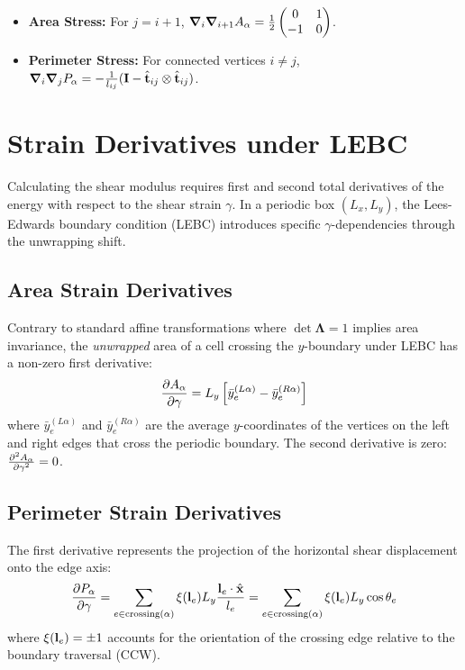\documentclass[12pt]{article}
\begin{document}
\begin{itemize}
    \item \textbf{Area Stress:} For $j = i+1$, $\grad_i \grad_{i+1} A_\alpha = \frac{1}{2} \begin{pmatrix} 0 & 1 \\ -1 & 0 \end{pmatrix}$.
    \item \textbf{Perimeter Stress:} For connected vertices $i \neq j$, $\grad_i \grad_j P_\alpha = -\frac{1}{l_{ij}} (\vb{I} - \hat{\vb{t}}_{ij} \otimes \hat{\vb{t}}_{ij})$.
\end{itemize}

\section{Strain Derivatives under LEBC}

Calculating the shear modulus requires first and second total derivatives of the energy with respect to the shear strain $\gamma$. In a periodic box $(L_x, L_y)$, the Lees-Edwards boundary condition (LEBC) introduces specific $\gamma$-dependencies through the unwrapping shift.

\subsection{Area Strain Derivatives}
Contrary to standard affine transformations where $\det \mathbf{\Lambda} = 1$ implies area invariance, the \textit{unwrapped} area of a cell crossing the $y$-boundary under LEBC has a non-zero first derivative:
\begin{equation}
    \pdv{A_\alpha}{\gamma} = L_y \left[ \bar{y}_e^{(L\alpha)} - \bar{y}_e^{(R\alpha)} \right]
\end{equation}
where $\bar{y}_e^{(L\alpha)}$ and $\bar{y}_e^{(R\alpha)}$ are the average $y$-coordinates of the vertices on the left and right edges that cross the periodic boundary. The second derivative is zero: $\pdv[2]{A_\alpha}{\gamma} = 0$.

\subsection{Perimeter Strain Derivatives}
The first derivative represents the projection of the horizontal shear displacement onto the edge axis:
\begin{equation}
    \pdv{P_\alpha}{\gamma} = \sum_{e \in \text{crossing}(\alpha)} \xi(\vb{l}_e) L_y \frac{\vb{l}_e \cdot \hat{\vb{x}}}{l_e} = \sum_{e \in \text{crossing}(\alpha)} \xi(\vb{l}_e) L_y \cos\theta_e
\end{equation}
where $\xi(\vb{l}_e) = \pm 1$ accounts for the orientation of the crossing edge relative to the boundary traversal (CCW).
\end{document}
